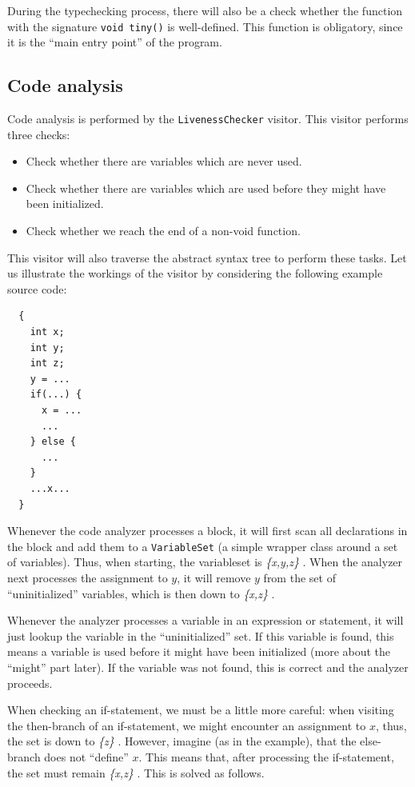 \documentclass[a4paper]{article}
\begin{document}
During the typechecking process, there will also be a check whether the
function with the signature \texttt{void tiny()} is well-defined. This
function is obligatory, since it is the ``main entry point'' of the program.

\subsection{Code analysis}

Code analysis is performed by the \texttt{LivenessChecker} visitor.
This visitor performs three checks:
\begin{itemize}
\item Check whether there are variables which are never used.
\item Check whether there are variables which are used before they might have
been initialized.
\item Check whether we reach the end of a non-void function.
\end{itemize}

This visitor will also traverse the abstract syntax tree to perform these
tasks. Let us illustrate the workings of the visitor by considering the
following example source code:
\begin{verbatim}
  {
    int x;
    int y;
    int z;
    y = ...
    if(...) {
      x = ...
      ...
    } else {
      ...
    }
    ...x... 
  }        
\end{verbatim}

\newcommand{\varset}[1]{
\textsl{\{#1\}}
}

Whenever the code analyzer processes a block, it will first scan all
declarations in the block and add them to a \texttt{VariableSet} (a simple
wrapper class around a set of variables). Thus, when starting, the variableset
is \varset{x,y,z}. When the analyzer next processes the assignment to $y$, it
will remove $y$ from the set of ``uninitialized'' variables, which is then
down to \varset{x,z}.

Whenever the analyzer processes a variable in an expression or statement, it
will just lookup the variable in the ``uninitialized'' set. If this variable
is found, this means a variable is used before it might have been initialized
(more about the ``might'' part later). If the variable was not found, this is
correct and the analyzer proceeds.

When checking an if-statement, we must be a little more careful: when visiting
the then-branch of an if-statement, we might encounter an assignment to
$x$, thus, the set is down to \varset{z}. However, imagine (as in the
example), that the else-branch does not ``define'' $x$. This means that, after
processing the if-statement, the set must remain \varset{x,z}. This is solved
as follows.
\end{document}
